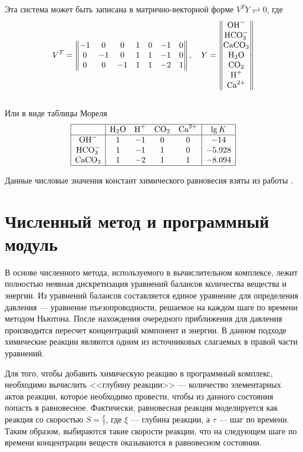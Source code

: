 \documentclass[14pt,a4paper]{extarticle}
\begin{document}
Эта  система может быть записана в матрично-векторной форме $V^T Y \rightleftharpoons 0$, где
$$V^T =  \begin{Vmatrix}
-1 &0 &0  &1 &0 &-1 &0\\
0 &-1 &0  &1 &1 &-1 &0\\
0  &0 &-1  &1 &1 &-2 &1
		\end{Vmatrix}, \quad
  Y = \begin{Vmatrix}
  \text{OH}^-\\
  \text{HCO}_3^{-}\\
  \text{CaCO}_3\\
  \text{H}_2\text{O}\\
  \text{CO}_2\\
  \text{H}^+\\
  \text{Ca}^{2+}
  \end{Vmatrix}$$\\
Или в виде таблицы Мореля\\
$$\begin{array}{|c|cccc|c|}
\hline
		&\text{H}_2\text{O}	&\text{H}^+	&\text{CO}_2	&\text{Ca}^{2+}	&\lg {K}\\
\hline
\text{OH}^-		&1		&-1		&0		  &0		&-14\\
\text{HCO}_3^{-}	&1		&-1		&1		  &0		&-5.928\\
\text{CaCO}_3		&1		&-2		&1		  &1		&-8.094\\
\hline
\end{array}$$

Данные числовые значения констант химического равновесия взяты из работы \cite{vostrikov}.

\clearpage
\section{Численный метод и программный модуль}

В основе численного метода, используемого в вычислительном комплексе, лежит полностью неявная дискретизация уравнений балансов количества вещества и энергии. Из уравнений балансов составляется единое уравнение для определения давления --- уравнение пъезопроводности, решаемое на каждом шаге по времени методом Ньютона. После нахождения очередного приближения для давления производится пересчет концентраций компонент и энергии. В данном подходе химические реакции являются одним из источниковых слагаемых в правой части уравнений.

Для того, чтобы добавить химическую реакцию в программный комплекс, необходимо вычислить <<глубину реакции>> --- количество элементарных актов реакции, которое необходимо провести, чтобы из данного состояния попасть в равновесное. Фактически, равновесная реакция моделируется как реакция со скоростью $S = \frac{\xi}{\tau}$, где $\xi$ --- глубина реакции, а $\tau$ --- шаг по времени. Таким образом, выбираются такие скорости реакции, что на следующем шаге по времени концентрации веществ оказываются в равновесном состоянии.
\end{document}
